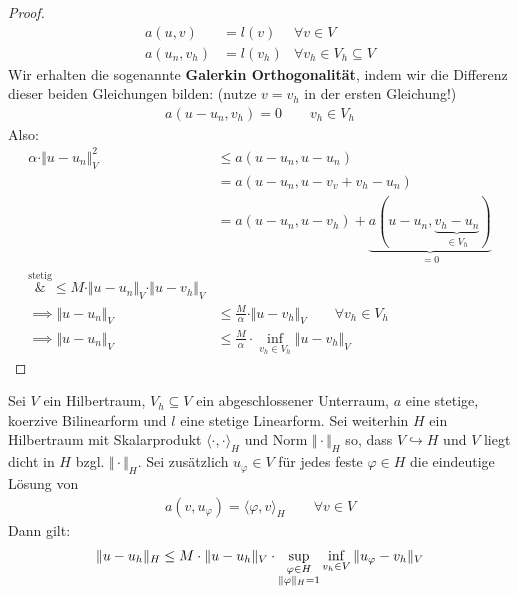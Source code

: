 \begin{proof}
	\begin{align*}
		a(u,v)&=l(v) &\forall v\in V\\
		a(u_n,v_h)&= l(v_h) &\forall v_h\in V_h\subseteq V
	\end{align*}
	Wir erhalten die sogenannte \textbf{Galerkin Orthogonalität}, indem wir die Differenz dieser beiden Gleichungen bilden:
	(nutze $v=v_h$ in der ersten Gleichung!)
	\begin{align}\label{eqGalerkinOrthogonalitaet}\tag{GalerkinOrtho}
		a(u-u_n,v_h)=0\qquad v_h\in V_h
	\end{align}
	Also:
	\begin{align*}
		\alpha\cdot\Vert u-u_n\Vert^2_V
		&\leq
		a(u-u_n,u-u_n)\\
		&=a(u-u_n,u-v_v+v_h- u_n)\\
		&=a(u-u_n,u-v_h)+\underbrace{a(u-u_n,\underbrace{v_h-u_n}_{\in V_h})}_{=0}\\
		\overset{\text{stetig}}&{\leq}
		M\cdot\Vert u-u_n\Vert_V\cdot\Vert u-v_h\Vert_V\\
		\implies
		\Vert u-u_n\Vert_V&\leq\frac{M}{\alpha}\cdot\Vert u-v_h\Vert_V\qquad\forall v_h\in V_h\\
		\implies
		\Vert u-u_n\Vert_V&\leq \frac{M}{\alpha}\cdot\inf\limits_{v_h\in V_h}\Vert u-v_h\Vert_V
	\end{align*}
\end{proof}

\begin{theorem}\enter\label{theorem2.3AubinNietscheDualitaetsargument}
	Sei $V$ ein Hilbertraum, $V_h\subseteq V$ ein abgeschlossener Unterraum, $a$ eine stetige, koerzive Bilinearform und $l$ eine stetige Linearform.
	Sei weiterhin $H$ ein Hilbertraum mit Skalarprodukt $\langle\cdot,\cdot\rangle_H$ und Norm $\Vert\cdot\Vert_H$ so, dass $V\hookrightarrow H$ und $V$ liegt dicht in $H$ bzgl. $\Vert\cdot\Vert_H$.
	Sei zusätzlich $u_\varphi\in V$ für jedes feste $\varphi\in H$ die eindeutige Lösung von
	\begin{align}\label{Dtheorem2.3}\tag{D}
		a(v,u_\varphi)=\langle\varphi,v\rangle_H\qquad\forall v\in V
	\end{align}
	Dann gilt:
	\begin{align*}
		\Vert u-u_h\Vert_H\leq M\cdot\Vert u-u_h\Vert_V\cdot\sup\limits_{\begin{subarray}{c}
			\varphi\in H\\
			\Vert\varphi\Vert_H=1
		\end{subarray}}\inf\limits_{v_h\in V}\Vert u_\varphi-v_h\Vert_V
	\end{align*}
\end{theorem}

